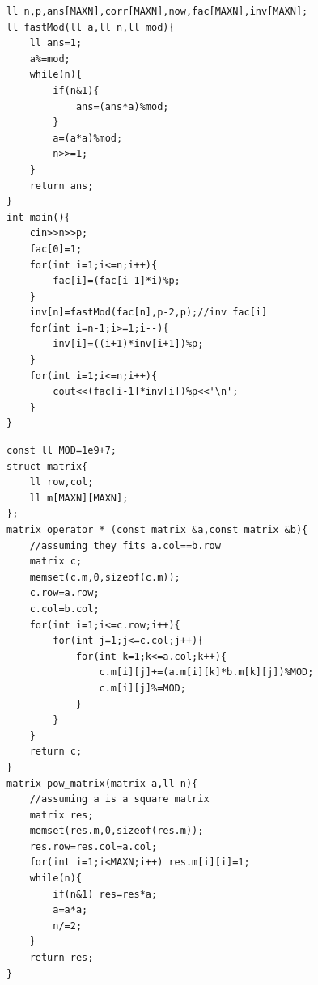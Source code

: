 \begin{lstlisting}
ll n,p,ans[MAXN],corr[MAXN],now,fac[MAXN],inv[MAXN];
ll fastMod(ll a,ll n,ll mod){
    ll ans=1;
    a%=mod;
    while(n){
        if(n&1){
            ans=(ans*a)%mod;
        }
        a=(a*a)%mod;
        n>>=1;
    }
    return ans;
}
int main(){
    cin>>n>>p;
    fac[0]=1;
    for(int i=1;i<=n;i++){
        fac[i]=(fac[i-1]*i)%p;
    }
    inv[n]=fastMod(fac[n],p-2,p);//inv fac[i]
    for(int i=n-1;i>=1;i--){
        inv[i]=((i+1)*inv[i+1])%p;
    }
    for(int i=1;i<=n;i++){
        cout<<(fac[i-1]*inv[i])%p<<'\n';
    }
}
\end{lstlisting}


\begin{lstlisting}
const ll MOD=1e9+7;
struct matrix{
    ll row,col;
    ll m[MAXN][MAXN];
};
matrix operator * (const matrix &a,const matrix &b){
    //assuming they fits a.col==b.row
    matrix c;
    memset(c.m,0,sizeof(c.m));
    c.row=a.row;
    c.col=b.col;
    for(int i=1;i<=c.row;i++){
        for(int j=1;j<=c.col;j++){
            for(int k=1;k<=a.col;k++){
                c.m[i][j]+=(a.m[i][k]*b.m[k][j])%MOD;
                c.m[i][j]%=MOD;
            }
        }
    }
    return c;
}
matrix pow_matrix(matrix a,ll n){
    //assuming a is a square matrix
    matrix res;
    memset(res.m,0,sizeof(res.m));
    res.row=res.col=a.col;
    for(int i=1;i<MAXN;i++) res.m[i][i]=1;
    while(n){
        if(n&1) res=res*a;
        a=a*a;
        n/=2;
    }
    return res;
}
\end{lstlisting}

